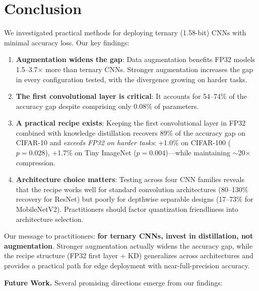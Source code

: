 \documentclass[10pt]{article}
\begin{document}
\section{Conclusion}
\label{sec:conclusion}

We investigated practical methods for deploying ternary (1.58-bit) CNNs with minimal accuracy loss. Our key findings:

\begin{enumerate}
    \item \textbf{Augmentation widens the gap}: Data augmentation benefits FP32 models 1.5--3.7$\times$ more than ternary CNNs. Stronger augmentation increases the gap in every configuration tested, with the divergence growing on harder tasks.
    \item \textbf{The first convolutional layer is critical}: It accounts for 54--74\% of the accuracy gap despite comprising only 0.08\% of parameters.
    \item \textbf{A practical recipe exists}: Keeping the first convolutional layer in FP32 combined with knowledge distillation recovers 89\% of the accuracy gap on CIFAR-10 and \emph{exceeds FP32 on harder tasks}: +1.0\% on CIFAR-100 ($p=0.028$), +1.7\% on Tiny ImageNet ($p=0.004$)---while maintaining $\sim$20$\times$ compression.
    \item \textbf{Architecture choice matters}: Testing across four CNN families reveals that the recipe works well for standard convolution architectures (80--130\% recovery for ResNet) but poorly for depthwise separable designs (17--73\% for MobileNetV2). Practitioners should factor quantization friendliness into architecture selection.
\end{enumerate}

Our message to practitioners: \textbf{for ternary CNNs, invest in distillation, not augmentation}. Stronger augmentation actually widens the accuracy gap, while the recipe structure (FP32 first layer + KD) generalizes across architectures and provides a practical path for edge deployment with near-full-precision accuracy.

\textbf{Future Work.} Several promising directions emerge from our findings:
\end{document}
